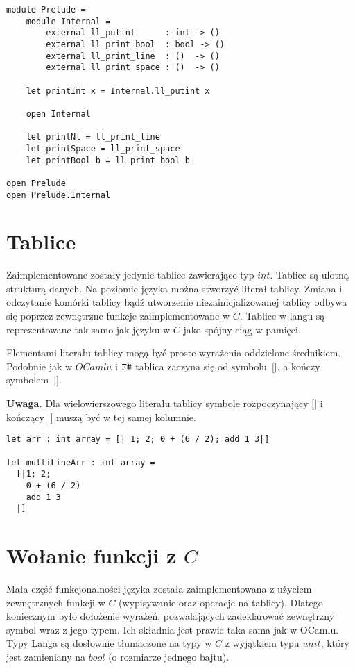 \documentclass[declaration,shortabstract]{iithesis}
\begin{document}
\begin{lstlisting}[frame=single, caption=Tworzenie i importowanie modułów.]
module Prelude = 
    module Internal = 
        external ll_putint      : int -> () 
        external ll_print_bool  : bool -> () 
        external ll_print_line  : ()  -> () 
        external ll_print_space : ()  -> () 

    let printInt x = Internal.ll_putint x

    open Internal 
    
    let printNl = ll_print_line
    let printSpace = ll_print_space
    let printBool b = ll_print_bool b

open Prelude
open Prelude.Internal
\end{lstlisting}


\section{Tablice}

Zaimplementowane zostały jedynie tablice zawierające typ $int$. Tablice są 
ulotną strukturą danych. Na poziomie języka można stworzyć literał tablicy.
Zmiana i odczytanie komórki tablicy bądź utworzenie niezainicjalizowanej 
tablicy odbywa się poprzez zewnętrzne funkcje zaimplementowane w $C$. 
Tablice w langu są reprezentowane tak samo jak języku w $C$ jako spójny ciąg w pamięci.

Elementami literału tablicy mogą być proste wyrażenia oddzielone średnikiem. 
Podobnie jak w $OCamlu$ i $\verb!F#!$ tablica zaczyna się od symbolu~$[|$, a 
kończy symbolem~$|]$.

\textbf{Uwaga.} Dla wielowierszowego literału tablicy symbole rozpoczynający 
$[|$ i kończący $|]$ muszą być w tej samej kolumnie.

\begin{lstlisting}[frame=single, caption=Tablice.]
let arr : int array = [| 1; 2; 0 + (6 / 2); add 1 3|]

let multiLineArr : int array = 
  [|1; 2;
    0 + (6 / 2)
    add 1 3
  |]
\end{lstlisting}

\section{Wołanie funkcji z $C$}

Mała część funkcjonalności języka została zaimplementowana z użyciem 
zewnętrznych funkcji w $C$ (wypisywanie oraz operacje na tablicy). Dlatego 
koniecznym było dołożenie wyrażeń, pozwalających zadeklarować zewnętrzny symbol 
wraz z jego typem. Ich składnia jest prawie taka sama jak w OCamlu. Typy 
Langa są dosłownie tłumaczone na typy w $C$ z wyjątkiem typu $unit$, który 
jest zamieniany na $bool$ (o rozmiarze jednego bajtu).
\end{document}
